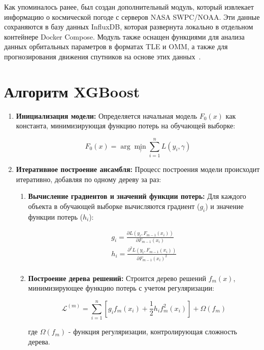 \documentclass[14pt, a4paper]{../cls/coursework}
\begin{document}
    Как упоминалось ранее, был создан дополнительный модуль, который извлекает информацию о космической погоде с серверов NASA SWPC/NOAA. Эти данные сохраняются в базу данных InfluxDB, которая развернута локально в отдельном контейнере Docker Compose.
    Модуль также оснащен функциями для анализа данных орбитальных параметров в форматах TLE и OMM, а также для прогнозирования движения спутников на основе этих данных~\cite{bottou_1991_stochastic,killick_2012_optimal}.

    \section{Алгоритм XGBoost}

    \begin{enumerate}[label=\arabic*.]
        \item \textbf{Инициализация модели:}
        Определяется начальная модель $F_0(x)$ как константа, минимизирующая функцию потерь на обучающей выборке:

        \[F_0(x) = \arg \min_{\gamma} \sum_{i=1}^n L(y_i, \gamma)\]

        \item \textbf{Итеративное построение ансамбля:}
        Процесс построения модели происходит итеративно, добавляя по одному дереву за раз:
        \begin{enumerate}[label=\roman*.]
            \item \textbf{Вычисление градиентов и значений функции потерь:} Для каждого объекта в обучающей выборке вычисляются градиент ($g_i$) и значение функции потерь ($h_i$):

            \begin{gather*}
                g_i = \frac{\partial L(y_i, F_{m-1}(x_i))}{\partial F_{m-1}(x_i)}\\
                h_i = \frac{\partial^2 L(y_i, F_{m-1}(x_i))}{\partial F_{m-1}(x_i)^2}\\
            \end{gather*}

            \item \textbf{Построение дерева решений:} Строится дерево решений $f_m(x)$, минимизирующее функцию потерь с учетом регуляризации:

            \[\mathcal{L}^{(m)} = \sum_{i=1}^n \left[ g_i f_m(x_i) + \frac{1}{2} h_i f_m^2(x_i) \right] + \Omega(f_m)\]

            где $\Omega(f_m)$ - функция регуляризации, контролирующая сложность дерева.


\end{enumerate}
\end{enumerate}
\end{document}
